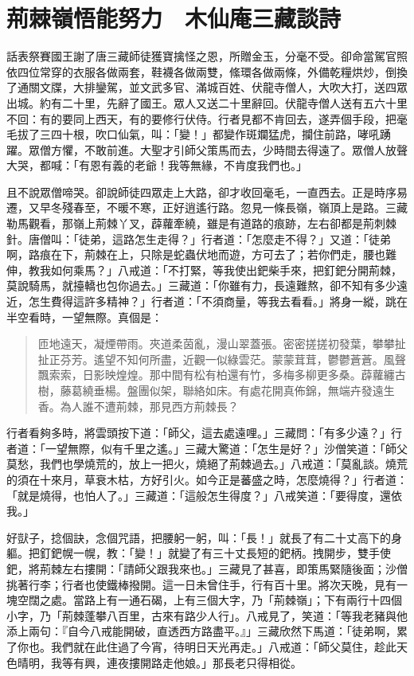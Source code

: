 
\chapter{荊棘嶺悟能努力　木仙庵三藏談詩}

話表祭賽國王謝了唐三藏師徒獲寶擒怪之恩，所贈金玉，分毫不受。卻命當駕官照依四位常穿的衣服各做兩套，鞋襪各做兩雙，絛環各做兩條，外備乾糧烘炒，倒換了通關文牒，大排鑾駕，並文武多官、滿城百姓、伏龍寺僧人，大吹大打，送四眾出城。約有二十里，先辭了國王。眾人又送二十里辭回。伏龍寺僧人送有五六十里不回：有的要同上西天，有的要修行伏侍。行者見都不肯回去，遂弄個手段，把毫毛拔了三四十根，吹口仙氣，叫：「變！」都變作斑斕猛虎，攔住前路，哮吼踴躍。眾僧方懼，不敢前進。大聖才引師父策馬而去，少時間去得遠了。眾僧人放聲大哭，都喊：「有恩有義的老爺！我等無緣，不肯度我們也。」

且不說眾僧啼哭。卻說師徒四眾走上大路，卻才收回毫毛，一直西去。正是時序易遷，又早冬殘春至，不暖不寒，正好逍遙行路。忽見一條長嶺，嶺頂上是路。三藏勒馬觀看，那嶺上荊棘丫叉，薜蘿牽繞，雖是有道路的痕跡，左右卻都是荊刺棘針。唐僧叫：「徒弟，這路怎生走得？」行者道：「怎麼走不得？」又道：「徒弟啊，路痕在下，荊棘在上，只除是蛇蟲伏地而遊，方可去了；若你們走，腰也難伸，教我如何乘馬？」八戒道：「不打緊，等我使出鈀柴手來，把釘鈀分開荊棘，莫說騎馬，就擡轎也包你過去。」三藏道：「你雖有力，長遠難熬，卻不知有多少遠近，怎生費得這許多精神？」行者道：「不須商量，等我去看看。」將身一縱，跳在半空看時，一望無際。真個是：
\begin{quote}
匝地遠天，凝煙帶雨。夾道柔茵亂，漫山翠蓋張。密密搓搓初發葉，攀攀扯扯正芬芳。遙望不知何所盡，近觀一似綠雲茫。蒙蒙茸茸，鬱鬱蒼蒼。風聲飄索索，日影映煌煌。那中間有松有柏還有竹，多梅多柳更多桑。薜蘿纏古樹，藤葛繞垂楊。盤團似架，聯絡如床。有處花開真佈錦，無端卉發遠生香。為人誰不遭荊棘，那見西方荊棘長？
\end{quote}

行者看夠多時，將雲頭按下道：「師父，這去處遠哩。」三藏問：「有多少遠？」行者道：「一望無際，似有千里之遙。」三藏大驚道：「怎生是好？」沙僧笑道：「師父莫愁，我們也學燒荒的，放上一把火，燒絕了荊棘過去。」八戒道：「莫亂談。燒荒的須在十來月，草衰木枯，方好引火。如今正是蕃盛之時，怎麼燒得？」行者道：「就是燒得，也怕人了。」三藏道：「這般怎生得度？」八戒笑道：「要得度，還依我。」

好獃子，捻個訣，念個咒語，把腰躬一躬，叫：「長！」就長了有二十丈高下的身軀。把釘鈀幌一幌，教：「變！」就變了有三十丈長短的鈀柄。拽開步，雙手使鈀，將荊棘左右摟開：「請師父跟我來也。」三藏見了甚喜，即策馬緊隨後面；沙僧挑著行李；行者也使鐵棒撥開。這一日未曾住手，行有百十里。將次天晚，見有一塊空闊之處。當路上有一通石碣，上有三個大字，乃「荊棘嶺」；下有兩行十四個小字，乃「荊棘蓬攀八百里，古來有路少人行」。八戒見了，笑道：「等我老豬與他添上兩句：『自今八戒能開破，直透西方路盡平。』」三藏欣然下馬道：「徒弟啊，累了你也。我們就在此住過了今宵，待明日天光再走。」八戒道：「師父莫住，趁此天色晴明，我等有興，連夜摟開路走他娘。」那長老只得相從。

